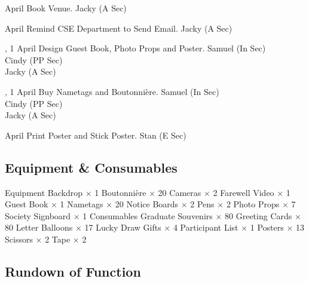 \bTR{}
\eTD{} April
\eTD\bTD Book Venue.
\eTD\bTD Jacky (A Sec)
\eTD\eTR

\bTR{}
\eTD{} April
\eTD\bTD Remind CSE Department to Send Email.
\eTD\bTD Jacky (A Sec)
\eTD\eTR

\bTR{}, 1
\eTD{} April
\eTD\bTD Design Guest Book, Photo Props and Poster.
\eTD\bTD Samuel (In Sec) \\ Cindy (PP Sec) \\ Jacky (A Sec)
\eTD\eTR

\bTR{}, 1
\eTD{} April
\eTD\bTD Buy Nametags and Boutonnière.
\eTD\bTD Samuel (In Sec) \\ Cindy (PP Sec) \\ Jacky (A Sec)
\eTD\eTR

\bTR{}
\eTD{} April
\eTD\bTD Print Poster and Stick Poster.
\eTD\bTD Stan (E Sec)
\eTD\eTR

\eTABLEbody
\eTABLE

\subsection{Equipment \& Consumables}
\starttabulate[|l|l|]
\NC{}Equipment\NC\NR
\HL
\NC Backdrop            \NC $\times$ 1  \NR
\NC Boutonnière         \NC $\times$ 20 \NR
\NC Cameras             \NC $\times$ 2  \NR
\NC Farewell Video      \NC $\times$ 1  \NR
\NC Guest Book          \NC $\times$ 1  \NR
\NC Nametags            \NC $\times$ 20 \NR
\NC Notice Boards       \NC $\times$ 2  \NR
\NC Pens                \NC $\times$ 2  \NR
\NC Photo Props         \NC $\times$ 7  \NR
\NC Society Signboard   \NC $\times$ 1  \NR
\HL
\NR
\NC{}Consumables\NC\NR
\HL
\NC Graduate Souvenirs  \NC $\times$ 80 \NR
\NC Greeting Cards      \NC $\times$ 80 \NR
\NC Letter Balloons     \NC $\times$ 17 \NR
\NC Lucky Draw Gifts    \NC $\times$ 4  \NR
\NC Participant List    \NC $\times$ 1  \NR
\NC Posters             \NC $\times$ 13 \NR
\NC Scissors            \NC $\times$ 2  \NR
\NC Tape                \NC $\times$ 2  \NR
\HL
\stoptabulate

\pagebreak
\subsection{Rundown of Function}

\setupTABLE[c][1][width=1.25in]
\setupTABLE[c][2][width=3.5in]
\setupTABLE[c][3][width=1.25in]
\bTABLE
\bTABLEhead

